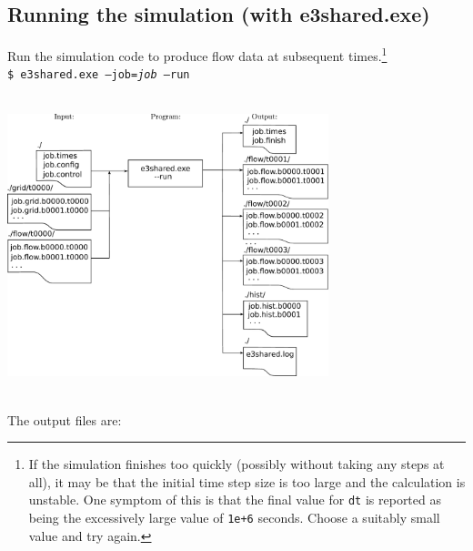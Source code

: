 \subsection{Running the simulation (with e3shared.exe)} 
Run the simulation code to produce flow data at subsequent times.\footnote{If the simulation
finishes too quickly (possibly without taking any steps at all),
it may be that the initial time step size is too large and the calculation is unstable.
One symptom of this is that the final value for \texttt{dt} is reported as being
the excessively large value of \texttt{1e+6} seconds.
Choose a suitably small value and try again.}\\ 
         \texttt{\$ e3shared.exe --job=\textit{job} --run}\\
         \vspace{0.25cm} \\
         \centerline{\includegraphics[width=0.7\textwidth]{figs/running-sim.pdf}}\\
         The output files are:
